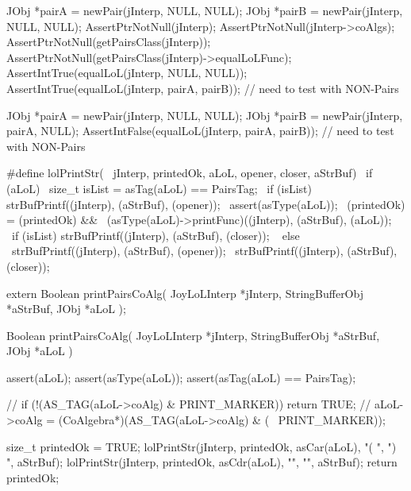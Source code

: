 \startCTest
  JObj *pairA = newPair(jInterp, NULL, NULL);
  JObj *pairB = newPair(jInterp, NULL, NULL);
  AssertPtrNotNull(jInterp);
  AssertPtrNotNull(jInterp->coAlgs);
  AssertPtrNotNull(getPairsClass(jInterp));
  AssertPtrNotNull(getPairsClass(jInterp)->equalLoLFunc);
  AssertIntTrue(equalLoL(jInterp, NULL, NULL));
  AssertIntTrue(equalLoL(jInterp, pairA, pairB));
  // need to test with NON-Pairs
\stopCTest
\stopTestCase

\startCTest
  JObj *pairA = newPair(jInterp, NULL,  NULL);
  JObj *pairB = newPair(jInterp, pairA, NULL);
  AssertIntFalse(equalLoL(jInterp, pairA, pairB));
  // need to test with NON-Pairs
\stopCTest
\stopTestCase
\stopTestSuite


\startCHeader
#define lolPrintStr(                                           \
  jInterp, printedOk, aLoL, opener, closer, aStrBuf)           \
  if (aLoL) {								                                   \
    size_t isList = asTag(aLoL) == PairsTag;        			     \
    if (isList) strBufPrintf((jInterp), (aStrBuf), (opener));  \
    assert(asType(aLoL));						                           \
    (printedOk) = (printedOk) && 						                   \
      (asType(aLoL)->printFunc)((jInterp), (aStrBuf), (aLoL)); \
    if (isList) strBufPrintf((jInterp), (aStrBuf), (closer));  \
  } else {								                                     \
    strBufPrintf((jInterp), (aStrBuf), (opener));						   \
    strBufPrintf((jInterp), (aStrBuf), (closer));						   \
  }
\stopCHeader

\setCHeaderStream{private}
\startCHeader
extern Boolean printPairsCoAlg(
  JoyLoLInterp    *jInterp,
  StringBufferObj *aStrBuf,
  JObj        *aLoL
);
\stopCHeader
\setCHeaderStream{public}

\startCCode
Boolean printPairsCoAlg(
  JoyLoLInterp    *jInterp,
  StringBufferObj *aStrBuf,
  JObj        *aLoL
) {
  assert(aLoL);
  assert(asType(aLoL));
  assert(asTag(aLoL) == PairsTag);

//  if (!(AS_TAG(aLoL->coAlg) & PRINT_MARKER)) return TRUE;
//  aLoL->coAlg = (CoAlgebra*)(AS_TAG(aLoL->coAlg) & (~ PRINT_MARKER));

  size_t printedOk = TRUE;
  lolPrintStr(jInterp, printedOk, asCar(aLoL), "( ", ") ", aStrBuf);
  lolPrintStr(jInterp, printedOk, asCdr(aLoL), "",   "",   aStrBuf);
  return printedOk;
}
\stopCCode

